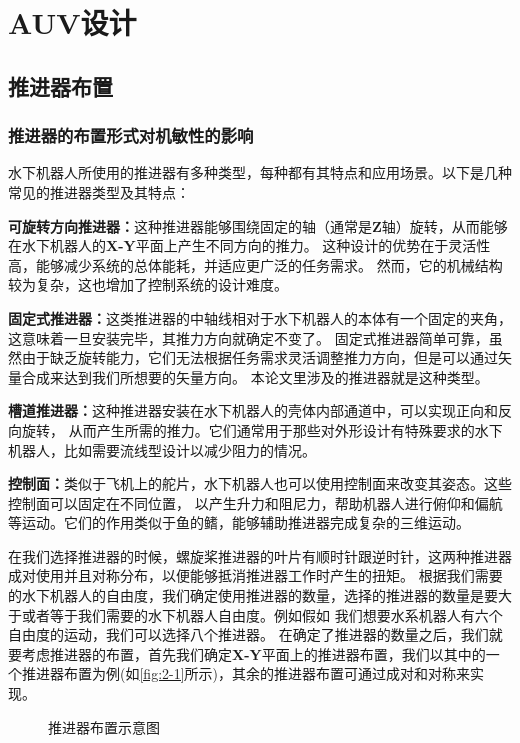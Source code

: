 \chapter{AUV设计}

\section{推进器布置}

\subsection{推进器的布置形式对机敏性的影响}

水下机器人所使用的推进器有多种类型，每种都有其特点和应用场景。以下是几种常见的推进器类型及其特点：

\textbf{可旋转方向推进器：}这种推进器能够围绕固定的轴（通常是{\bf{Z}}轴）旋转，从而能够在水下机器人的{\bf{X-Y}}平面上产生不同方向的推力。
这种设计的优势在于灵活性高，能够减少系统的总体能耗，并适应更广泛的任务需求。
然而，它的机械结构较为复杂，这也增加了控制系统的设计难度。

\textbf{固定式推进器：}这类推进器的中轴线相对于水下机器人的本体有一个固定的夹角，
这意味着一旦安装完毕，其推力方向就确定不变了。
固定式推进器简单可靠，虽然由于缺乏旋转能力，它们无法根据任务需求灵活调整推力方向，但是可以通过矢量合成来达到我们所想要的矢量方向。
本论文里涉及的推进器就是这种类型。

\textbf{槽道推进器：}这种推进器安装在水下机器人的壳体内部通道中，可以实现正向和反向旋转，
从而产生所需的推力。它们通常用于那些对外形设计有特殊要求的水下机器人，比如需要流线型设计以减少阻力的情况。

\textbf{控制面：}类似于飞机上的舵片，水下机器人也可以使用控制面来改变其姿态。这些控制面可以固定在不同位置，
以产生升力和阻尼力，帮助机器人进行俯仰和偏航等运动。它们的作用类似于鱼的鳍，能够辅助推进器完成复杂的三维运动。

在我们选择推进器的时候，螺旋桨推进器的叶片有顺时针跟逆时针，这两种推进器成对使用并且对称分布，以便能够抵消推进器工作时产生的扭矩。
根据我们需要的水下机器人的自由度，我们确定使用推进器的数量，选择的推进器的数量是要大于或者等于我们需要的水下机器人自由度。例如假如
我们想要水系机器人有六个自由度的运动，我们可以选择八个推进器。
在确定了推进器的数量之后，我们就要考虑推进器的布置，首先我们确定{\bf{X-Y}}平面上的推进器布置，我们以其中的一个推进器布置为例(如\autoref{fig:2-1}所示)，其余的推进器布置可通过成对和对称来实现。

\begin{figure}[H]%
    \centering
    \caption{\label{fig:2-1}推进器布置示意图}
\end{figure}


